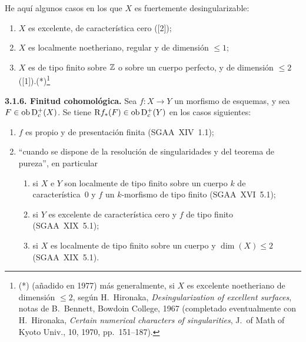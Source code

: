 He aquí algunos casos en los que $X$ es fuertemente desingularizable:
\begin{enumerate}
\item[a)] $X$ es excelente, de característica cero ([2]);
\item[b)] $X$ es localmente noetheriano, regular y de dimensión $\leqslant 1$;
\item[c)] $X$ es de tipo finito sobre $\mathbb{Z}$ o sobre un cuerpo perfecto, y de dimensión $\leqslant 2$ ([1]).(*)\footnote{(*) (añadido en 1977) más generalmente, si $X$ es excelente noetheriano de dimensión $\leqslant 2$, según H.~Hironaka, \emph{Desingularization of excellent surfaces}, notas de B.~Bennett, Bowdoin College, 1967 (completado eventualmente con H.~Hironaka, \emph{Certain numerical characters of singularities}, J.~of Math of Kyoto Univ., 10, 1970, pp.~151--187).}
\end{enumerate}

\textbf{3.1.6. Finitud cohomológica.} Sea $f : X \to Y$ un morfismo de esquemas, y sea $F \in \operatorname{ob} \mathrm{D}_c^{+}(X)$. Se tiene $\mathrm{R} f_{*}(F) \in \operatorname{ob} \mathrm{D}_c^{+}(Y)$ en los casos siguientes:
\begin{enumerate}
\item[a)] $f$ es propio y de presentación finita (SGAA~XIV~1.1);
\item[b)] \textquotedblleft cuando se dispone de la resolución de singularidades y del teorema de pureza\textquotedblright{}, en particular
\begin{enumerate}
\item[(i)] si $X$ e $Y$ son localmente de tipo finito sobre un cuerpo $k$ de característica~0 y $f$ un $k$-morfismo de tipo finito (SGAA~XVI~5.1);
\item[(ii)] si $Y$ es excelente de característica cero y $f$ de tipo finito (SGAA~XIX~5.1);
\item[(iii)] si $X$ es localmente de tipo finito sobre un cuerpo y $\dim(X) \leqslant 2$ (SGAA~XIX~5.1).
\end{enumerate}
\end{enumerate}
